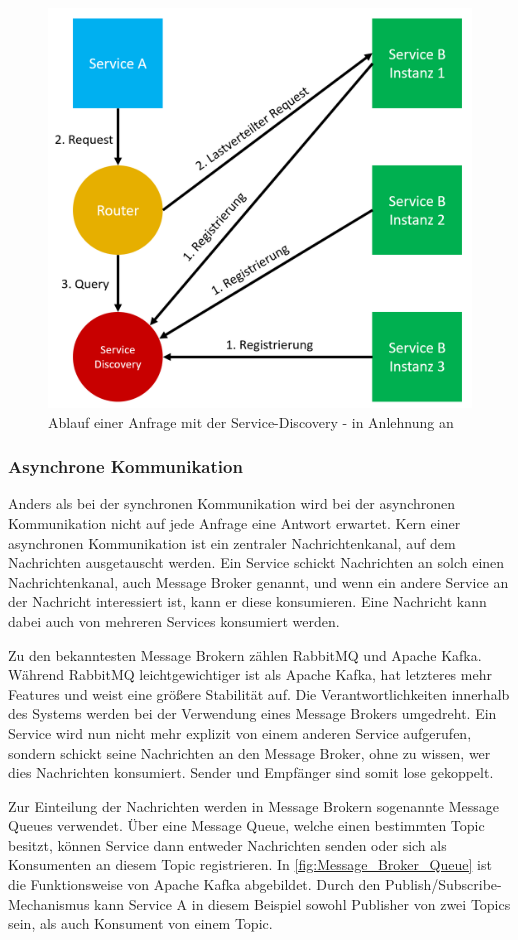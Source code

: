 \begin{figure}[H]
    \centering
    \includegraphics[width=0.65\linewidth]{images/service-discovery.png}
    \caption{Ablauf einer Anfrage mit der Service-Discovery - in Anlehnung an \cite{MichaelSchwab.2019}}
    \label{fig:service_discovery}
\end{figure}

\subsubsection*{Asynchrone Kommunikation}

Anders als bei der synchronen Kommunikation wird bei der asynchronen Kommunikation nicht auf jede Anfrage eine Antwort erwartet. Kern einer asynchronen Kommunikation ist ein zentraler Nachrichtenkanal, auf dem Nachrichten ausgetauscht werden. Ein Service schickt Nachrichten an solch einen Nachrichtenkanal, auch Message Broker genannt, und wenn ein andere Service an der Nachricht interessiert ist, kann er diese konsumieren. Eine Nachricht kann dabei auch von mehreren Services konsumiert werden.

Zu den bekanntesten Message Brokern zählen RabbitMQ und Apache Kafka. Während RabbitMQ leichtgewichtiger ist als Apache Kafka, hat letzteres mehr Features und weist eine größere Stabilität auf. Die Verantwortlichkeiten innerhalb des Systems werden bei der Verwendung eines Message Brokers umgedreht. Ein Service wird nun nicht mehr explizit von einem anderen Service aufgerufen, sondern schickt seine Nachrichten an den Message Broker, ohne zu wissen, wer dies Nachrichten konsumiert. Sender und Empfänger sind somit lose gekoppelt.

Zur Einteilung der Nachrichten werden in Message Brokern sogenannte Message Queues verwendet. Über eine Message Queue, welche einen bestimmten Topic besitzt, können Service dann entweder Nachrichten senden oder sich als Konsumenten an diesem Topic registrieren. In \autoref{fig:Message_Broker_Queue} ist die Funktionsweise von Apache Kafka abgebildet. Durch den Publish/Subscribe-Mechanismus kann Service A in diesem Beispiel sowohl Publisher von zwei Topics sein, als auch Konsument von einem Topic.

